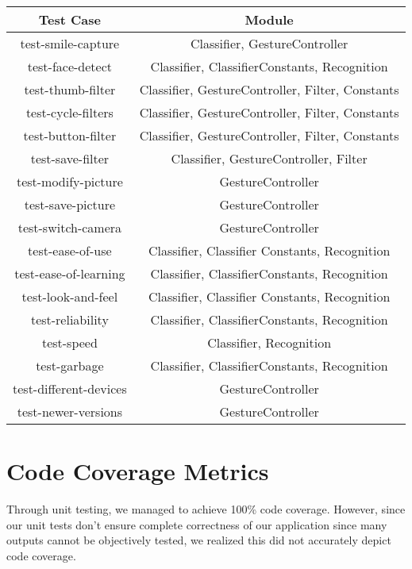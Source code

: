 \documentclass[12pt, titlepage]{article}
\begin{document}
\begin{center}
\begin{tabular}{ |c|c| } 
 \hline
 Test Case & Module \\ 
  \hline
   \hline
    test-smile-capture & Classifier, GestureController \\ 
  \hline
    test-face-detect & Classifier, ClassifierConstants, Recognition \\ 
  \hline
    test-thumb-filter & Classifier, GestureController, Filter, Constants \\ 
  \hline
  test-cycle-filters & Classifier, GestureController, Filter, Constants \\ 
  \hline
  test-button-filter & Classifier, GestureController, Filter, Constants \\ 
  \hline
  test-save-filter & Classifier, GestureController, Filter \\ 
  \hline
  test-modify-picture & GestureController \\ 
  \hline
  test-save-picture & GestureController \\ 
  \hline
  test-switch-camera & GestureController \\ 
  \hline
  test-ease-of-use & Classifier, Classifier Constants, Recognition \\ 
  \hline
  test-ease-of-learning & Classifier, ClassifierConstants, Recognition \\ 
  \hline
  test-look-and-feel & Classifier, Classifier Constants, Recognition \\ 
  \hline
  test-reliability & Classifier, ClassifierConstants, Recognition \\ 
  \hline
  test-speed & Classifier, Recognition \\ 
  \hline
  test-garbage & Classifier, ClassifierConstants, Recognition \\ 
  \hline
  test-different-devices & GestureController \\ 
  \hline
  test-newer-versions & GestureController \\ 
  \hline
\end{tabular}
\end{center}

\section{Code Coverage Metrics}
Through unit testing, we managed to achieve 100\% code coverage. However, since our unit tests don't ensure complete correctness of our application since many outputs cannot be objectively tested, we realized this did not accurately depict code coverage.\\
\end{document}
